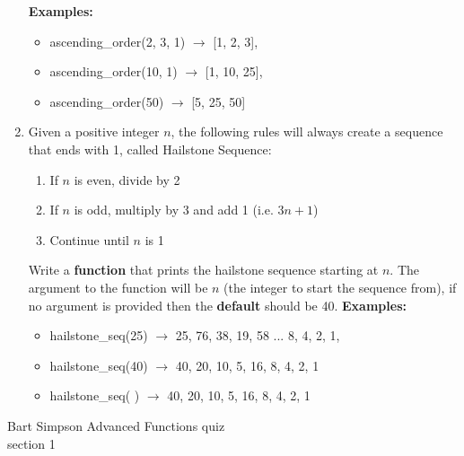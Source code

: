 \documentclass{article}
\begin{document}
\begin{enumerate}
	\textbf{Examples:}
	\begin{itemize}
		\item  ascending\_order(2, 3, 1) $\rightarrow$ [1, 2, 3], 
		\item  ascending\_order(10, 1) $\rightarrow$ [1, 10, 25], 
		\item  ascending\_order(50) $\rightarrow$ [5, 25, 50] 
	\end{itemize}


	\item 
		Given a positive integer $n$, the following rules will always create a sequence that 
		ends with 1, called Hailstone Sequence:
		\begin{enumerate}
			\item If $n$ is even, divide by 2
			\item If $n$ is odd, multiply by 3 and add 1 (i.e. $3n+1$)
			\item Continue until $n$ is 1
		\end{enumerate}
		Write a \textbf{function} that prints the hailstone sequence starting at $n$. 
		The argument to the function will be $n$ (the integer to start the sequence from), 
		if no argument is provided then the \textbf{default} should be 40.
		\textbf{Examples:}		
		\begin{itemize}
			\item  hailstone\_seq(25) $\rightarrow$ 25, 76, 38, 19, 58 ... 8, 4, 2, 1, 
			\item  hailstone\_seq(40) $\rightarrow$ 40, 20, 10, 5, 16, 8, 4, 2, 1
			\item  hailstone\_seq( ) $\rightarrow$ 40, 20, 10, 5, 16, 8, 4, 2, 1
		\end{itemize}


\end{enumerate}
\pagebreak
Bart Simpson \hfill Advanced Functions quiz\\
section 1\\
\end{document}
